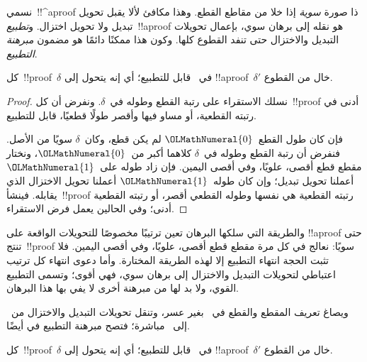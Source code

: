 \documentclass[../../../include/open-logic-section]{subfiles}
\begin{document}


نسمي~!!^a{proof} ذا صورة \emph{سوية} إذا خلا من مقاطع القطع. وهذا مكافئ
لألا يقبل تحويل تبديل ولا تحويل اختزال. و\emph{تطبيع}~!!a{proof} هو
نقله إلى برهان سوي، بإعمال تحويلات التبديل والاختزال حتى تنفد القطوع
كلها. وكون هذا ممكنًا دائمًا هو مضمون \emph{مبرهنة التطبيع}.

\begin{thm}
كل~!!{proof}~$\delta$ في~ قابل للتطبيع؛ أي إنه يتحول إلى
!!a{proof}~$\delta'$ خال من القطوع.
\end{thm}

\begin{proof}
  نسلك الاستقراء على رتبة القطع وطوله في~$\delta$. ونفرض أن كل~!!{proof}
  أدنى في رتبته القطعية، أو مساو فيها وأقصر طولًا قطعيًا، قابل للتطبيع.

  فإن كان طول القطع~${\OLMathNumeral{0}}$ لم يكن قطع، وكان~$\delta$ سويًا من الأصل. فنفرض
  أن رتبة القطع وطوله في~$\delta$ كلاهما أكبر من~${\OLMathNumeral{0}}$، ونختار مقطع قطع
  أقصى، علويًا، وفي أقصى اليمين. فإن زاد طوله على~${\OLMathNumeral{1}}$ أعملنا تحويل تبديل؛
  وإن كان طوله~${\OLMathNumeral{1}}$ أعملنا تحويل الاختزال الذي يقابله. فينشأ~!!{proof}
  رتبته القطعية هي نفسها وطوله القطعي أقصر، أو رتبته القطعية أدنى؛ وفي
  الحالين يعمل فرض الاستقراء.
\end{proof}

والطريقة التي سلكها البرهان تعين ترتيبًا مخصوصًا للتحويلات الواقعة على
!!a{proof} حتى تنتج~!!{proof} سويًا: نعالج في كل مرة مقطع قطع أقصى،
علويًا، وفي أقصى اليمين. فلا تثبت الحجة انتهاء التطبيع إلا لهذه الطريقة
المختارة. وأما دعوى انتهاء كل ترتيب اعتباطي لتحويلات التبديل والاختزال
إلى برهان سوي، فهي أقوى؛ وتسمى التطبيع القوي، ولا بد لها من مبرهنة أخرى
لا يفي بها هذا البرهان.

ويصاغ تعريف المقطع والقطع في~ بغير عسر، وتنقل تحويلات التبديل
والاختزال من~ إلى~ مباشرة؛ فتصح مبرهنة التطبيع في
 أيضًا.

\begin{thm}
كل~!!{proof}~$\delta$ في~ قابل للتطبيع؛ أي إنه يتحول إلى
!!a{proof}~$\delta'$ خال من القطوع.
\end{thm}
\end{document}

